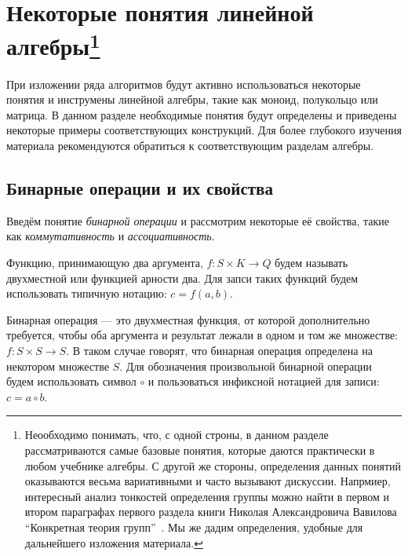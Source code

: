 \chapter[Некоторые понятия линейной алгебры]{Некоторые понятия линейной алгебры\footnote{Неообходимо понимать, что, с одной строны, в данном разделе рассматриваются самые базовые понятия, которые даются практически в любом учебнике алгебры. С другой же стороны, определения данных понятий оказываются весьма вариативными и часто вызывают дискуссии. Напрмиер, интересный анализ тонкостей определения группы можно найти в первом и втором параграфах первого раздела книги Николая Александровича Вавилова ``Конкретная теория групп''~\cite{VavilovGroups}. Мы же дадим определения, удобные для дальнейшего изложения материала.}}\label{chpt:LinAlIntro}

При изложении ряда алгоритмов будут активно использоваться некоторые понятия и инструмены линейной алгебры, такие как моноид, полукольцо или матрица.
В данном разделе необходимые понятия будут определены и приведены некоторые примеры соответствующих конструкций. Для более глубокого изучения материала рекомендуются обратиться к соответствующим разделам алгебры.


\section{Бинарные операции и их свойства}


Введём понятие \textit{бинарной операции} и рассмотрим некоторые её свойства, такие как \textit{коммутативность} и \textit{ассоциативность}.

\begin{definition} Функцию, принимающую два аргумента, $f: S \times K \to Q$ будем называть двухместной или функцией арности два.
Для запси таких функций будем использовать типичную нотацию: $c = f(a,b)$.
\end{definition}


\begin{definition} 
Бинарная операция --- это двухместная функция, от которой дополнительно требуется, чтобы оба аргумента и результат лежали в одном и том же множестве: $f: S \times S \to S$. В таком случае говорят, что бинарная операция определена на некотором множестве $S$. Для обозначения произвольной бинарной операции будем использовать символ $\circ$ и пользоваться инфиксной нотацией для записи: $c = a \circ b$.
\end{definition}




